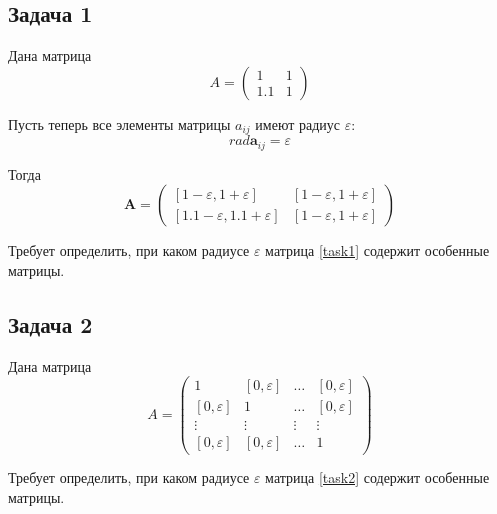 \subsection{Задача 1}
Дана матрица 
\begin{equation}
A = 
\begin{pmatrix}
1 & 1\\
1.1 & 1
\end{pmatrix}
\end{equation}

Пусть теперь все элементы матрицы $a_{ij}$ имеют радиус $\varepsilon$:
\begin{equation}
rad \mathbf{a}_{ij} = \varepsilon
\end{equation}

Тогда
\begin{equation}\label{task1}
\mathbf{A} = 
\begin{pmatrix}
[1 - \varepsilon, 1 + \varepsilon] &  [1 - \varepsilon, 1 + \varepsilon] \\
[1.1 - \varepsilon, 1.1 + \varepsilon] & [1 - \varepsilon, 1 + \varepsilon]
\end{pmatrix}
\end{equation}

Требует определить, при каком радиусе $\varepsilon$ матрица \eqref{task1} содержит особенные матрицы.

\subsection{Задача 2}
Дана матрица
\begin{equation}
A = 
\begin{pmatrix}\label{task2}
1 & [0, \varepsilon] & \dots & [0, \varepsilon] \\
[0, \varepsilon] & 1 & \dots & [0, \varepsilon] \\
\vdots & \vdots & \vdots & \vdots \\
[0, \varepsilon] & [0, \varepsilon] & \dots & 1
\end{pmatrix}
\end{equation}

Требует определить, при каком радиусе $\varepsilon$ матрица \eqref{task2} содержит особенные матрицы.